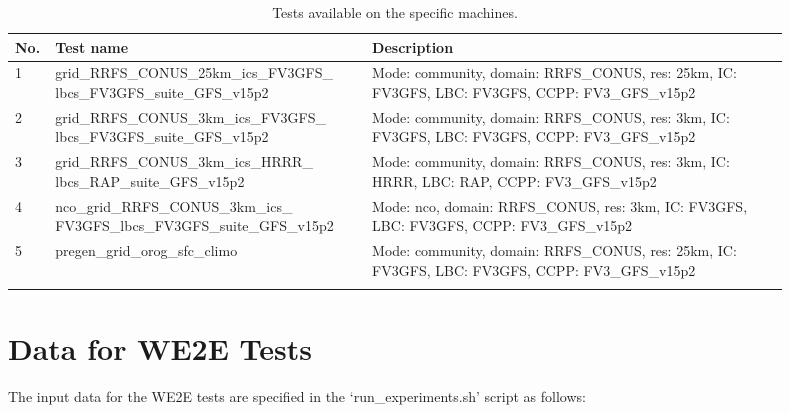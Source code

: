 \documentclass[11pt,fleqn]{report}              %
\begin{document}
{
\fontsize{9}{11}\selectfont
\begin{longtable}{p{0.02\linewidth} | p{0.38\linewidth} | p{0.5\linewidth}  }
\hline
\hline
No. & Test name & Description  \\
\hline
1 & grid\_RRFS\_CONUS\_25km\_ics\_FV3GFS\_ lbcs\_FV3GFS\_suite\_GFS\_v15p2 & Mode: community, domain: RRFS\_CONUS, res: 25km, IC: FV3GFS, LBC: FV3GFS, CCPP: FV3\_GFS\_v15p2  \\
2 & grid\_RRFS\_CONUS\_3km\_ics\_FV3GFS\_ lbcs\_FV3GFS\_suite\_GFS\_v15p2  & Mode: community, domain: RRFS\_CONUS, res: 3km, IC: FV3GFS, LBC: FV3GFS, CCPP: FV3\_GFS\_v15p2 \\
3 & grid\_RRFS\_CONUS\_3km\_ics\_HRRR\_ lbcs\_RAP\_suite\_GFS\_v15p2 & Mode: community, domain: RRFS\_CONUS, res: 3km, IC: HRRR, LBC: RAP, CCPP: FV3\_GFS\_v15p2 \\
4 & nco\_grid\_RRFS\_CONUS\_3km\_ics\_ FV3GFS\_lbcs\_FV3GFS\_suite\_GFS\_v15p2  & Mode: nco, domain: RRFS\_CONUS, res: 3km, IC: FV3GFS, LBC: FV3GFS, CCPP: FV3\_GFS\_v15p2 \\
5 & pregen\_grid\_orog\_sfc\_climo & Mode: community, domain: RRFS\_CONUS, res: 25km, IC: FV3GFS, LBC: FV3GFS, CCPP: FV3\_GFS\_v15p2 \\
\hline
\caption{Tests available on the specific machines.}
\label{table:we2e_test_list}
\end{longtable}
}



\section{Data for WE2E Tests}
\label{sec:we2e_data}

The input data for the WE2E tests are specified in the `run\_experiments.sh' script as follows:
\end{document}
